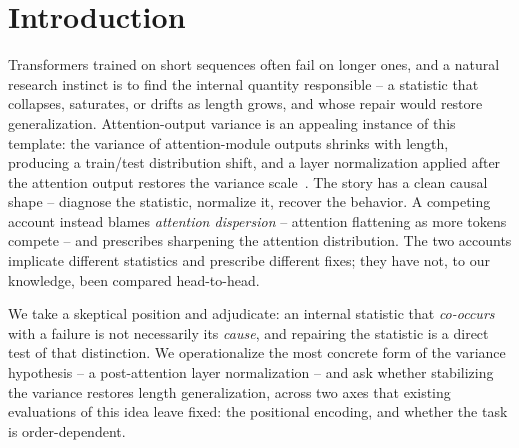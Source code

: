 \documentclass[11pt]{article}
\begin{document}
\section{Introduction}
Transformers trained on short sequences often fail on longer ones, and a natural research instinct is to
find the internal quantity responsible -- a statistic that collapses, saturates, or drifts as length
grows, and whose repair would restore generalization. Attention-output variance is an appealing instance
of this template: the variance of attention-module outputs shrinks with length, producing a train/test
distribution shift, and a layer normalization applied after the attention output restores the variance
scale~\cite{vanishingvariance}. The story has a clean causal shape -- diagnose the statistic, normalize
it, recover the behavior. A competing account instead blames \emph{attention dispersion} -- attention
flattening as more tokens compete -- and prescribes sharpening the attention distribution. The two
accounts implicate different statistics and prescribe different fixes; they have not, to our knowledge,
been compared head-to-head.

We take a skeptical position and adjudicate: an internal statistic that \emph{co-occurs} with a failure is
not necessarily its \emph{cause}, and repairing the statistic is a direct test of that distinction. We
operationalize the most concrete form of the variance hypothesis -- a post-attention layer normalization
-- and ask whether stabilizing the variance restores length generalization, across two axes that
existing evaluations of this idea leave fixed: the positional encoding, and whether the task is
order-dependent.
\end{document}
